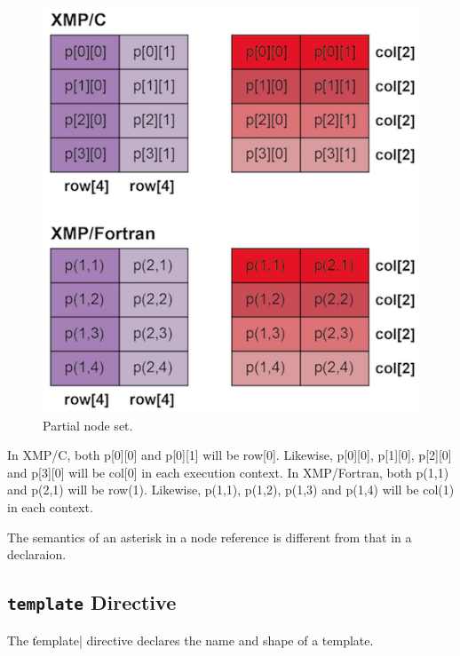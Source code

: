 \begin{figure}
  \centering
  \includegraphics{figs/row_col.png}
  \caption{Partial node set.}
  \label{fig:partial}
\end{figure}

In XMP/C, both p[0][0] and p[0][1] will be row[0]. Likewise, p[0][0],
p[1][0], p[2][0] and p[3][0] will be col[0] in each execution
context. In XMP/Fortran, both p(1,1) and p(2,1) will be
row(1). Likewise, p(1,1), p(1,2), p(1,3) and p(1,4) will be col(1) in
each context.

\begin{mynote}
The semantics of an asterisk in a
node reference is different from that in a declaraion.
\end{mynote}


\subsection{{\tt template} Directive}

The \|template| directive declares the name and shape of a
template.


